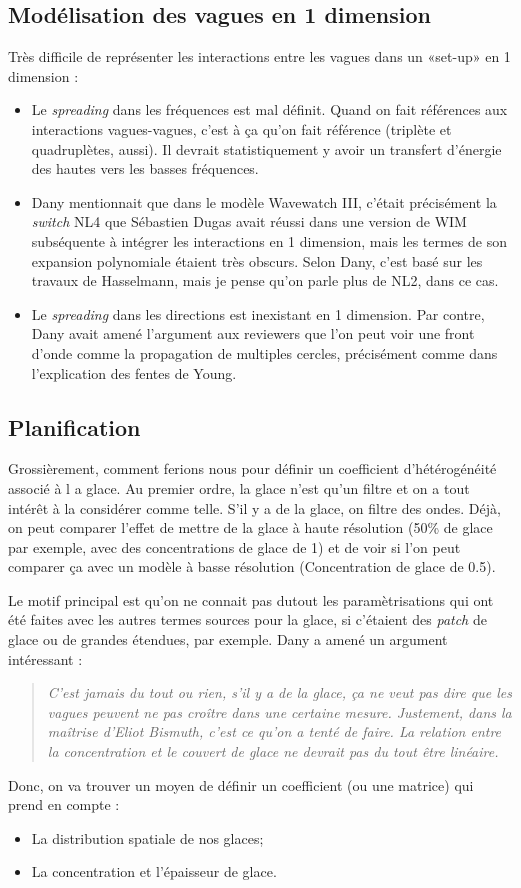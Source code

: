 \documentclass[10pt]{article}
\numberwithin{equation}{section}
\begin{document}
\subsection{Modélisation des vagues en 1 dimension}
\label{sec:org0a0dfe4}
Très difficile de représenter les interactions  entre les vagues dans un «set-up» en 1 dimension : 
\begin{itemize}
\item Le \emph{spreading} dans les fréquences est mal définit.
Quand on fait références aux interactions vagues-vagues, c'est à ça qu'on fait référence (triplète et quadruplètes, aussi).
Il devrait statistiquement y avoir un transfert d'énergie des hautes vers les basses fréquences.
\item Dany mentionnait que dans le modèle Wavewatch III, c'était précisément la \emph{switch} NL4 que Sébastien Dugas avait réussi dans une version de WIM subséquente à intégrer les interactions en 1 dimension, mais les termes de son expansion polynomiale étaient très obscurs.
Selon Dany, c'est basé sur les travaux de Hasselmann, mais je pense qu'on parle plus de NL2, dans ce cas.
\item Le \emph{spreading} dans les directions est inexistant en 1 dimension.
Par contre, Dany avait amené l'argument aux reviewers que l'on peut voir une front d'onde comme la propagation de multiples cercles, précisément comme dans l'explication des fentes de Young.
\end{itemize}
\subsection{Planification}
\label{sec:org8cc02ab}
Grossièrement, comment ferions nous pour définir un coefficient d'hétérogénéité associé à l a glace.
Au premier ordre, la glace n'est qu'un filtre et on a tout intérêt à la considérer comme telle.
S'il y a de la glace, on filtre des ondes.
Déjà, on peut comparer l'effet de mettre de la glace à haute résolution (50\% de glace par exemple, avec des concentrations de glace de 1) et de voir si l'on peut comparer ça avec un modèle à basse résolution (Concentration de glace de 0.5). \bigskip

Le motif principal est qu'on ne connait pas dutout les paramètrisations qui ont été faites avec les autres termes sources pour la glace, si c'étaient des \emph{patch} de glace ou de grandes étendues, par exemple.
Dany a amené un argument intéressant :\smallskip
\begin{quote}
\emph{C'est jamais du tout ou rien, s'il y a de la glace, ça ne veut pas dire que les vagues peuvent ne pas croître dans une certaine mesure. Justement, dans la maîtrise d'Eliot Bismuth, c'est ce qu'on a tenté de faire. La relation entre la concentration et le couvert de glace ne devrait pas du tout être linéaire.}
\end{quote}
Donc, on va trouver un moyen de définir un coefficient (ou une matrice) qui prend en compte :
\begin{itemize}
\item La distribution spatiale de nos glaces;
\item La concentration et l'épaisseur de glace.
\end{itemize}
\end{document}
